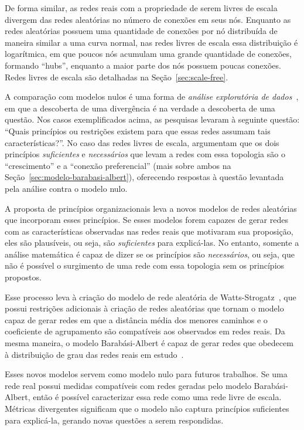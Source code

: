 \documentclass[12pt,a4paper,final]{article}
\begin{document}
De forma similar, as redes reais com a propriedade de serem livres de escala divergem das redes aleatórias no número de conexões em seus nós. Enquanto as redes aleatórias possuem uma quantidade de conexões por nó distribuída de maneira similar a uma curva normal, nas redes livres de escala essa distribuição é logarítmica, em que poucos nós acumulam uma grande quantidade de conexões, formando \enquote{hubs}, enquanto a maior parte dos nós possuem poucas conexões. Redes livres de escala são detalhadas na Seção~\ref{sec:scale-free}.

A comparação com modelos nulos é uma forma de \textit{análise exploratória de dados}~\cite{Zweig2016-rb}, em que a descoberta de uma divergência é na verdade a descoberta de uma questão. Nos casos exemplificados acima, as pesquisas levaram à seguinte questão: \enquote{Quais princípios ou restrições existem para que essas redes assumam tais características?}. No caso das redes livres de escala,  argumentam que os dois princípios  \textit{suficientes} e \textit{necessários} que levam a redes com essa topologia são o \enquote{crescimento} e a \enquote{conexão preferencial} (mais sobre ambos na Seção~\ref{sec:modelo-barabasi-albert}), oferecendo respostas à questão levantada pela análise contra o modelo nulo.

A proposta de princípios organizacionais leva a novos modelos de redes aleatórias que incorporam esses princípios. Se esses modelos forem capazes de gerar redes com as características observadas nas redes reais que motivaram sua proposição, eles são plausíveis, ou seja, são \textit{suficientes} para explicá-las. No entanto, somente a análise matemática é capaz de dizer se os princípios são \textit{necessários}, ou seja, que não é possível o surgimento de uma rede com essa topologia sem os princípios propostos.

Esse processo leva à criação do modelo de rede aleatória de Watts-Strogatz~\cite{Watts1998-wt}, que possui restrições adicionais à criação de redes aleatórias que tornam o modelo capaz de gerar redes em que a distância média dos menores caminhos e o coeficiente de agrupamento são compatíveis aos observados em redes reais. Da mesma maneira, o modelo Barabási-Albert é capaz de gerar redes que obedecem à distribuição de grau das redes reais em estudo~\cite{Barabasi1999-sn}.

Esses novos modelos servem como modelo nulo para futuros trabalhos. Se uma rede real possui medidas compatíveis com redes geradas pelo modelo Barabási-Albert, então é possível caracterizar essa rede como uma rede livre de escala. Métricas divergentes significam que o modelo não captura princípios suficientes para explicá-la, gerando novas questões a serem respondidas.
\end{document}
